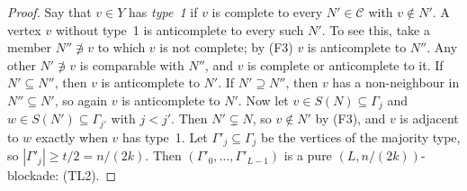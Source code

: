\begin{proof}
Say that $v\in Y$ has \emph{type~1} if $v$ is complete to every $N'\in\mathcal C$ with $v\notin N'$. A
vertex $v$ without type~1 is anticomplete to every such $N'$. To see this, take a member $N''\not\ni v$
to which $v$ is not complete; by (F3) $v$ is anticomplete to $N''$. Any other $N'\not\ni v$ is
comparable with $N''$, and $v$ is complete or anticomplete to it. If $N'\subseteq N''$, then $v$ is
anticomplete to $N'$. If $N'\supseteq N''$, then $v$ has a non-neighbour in $N''\subseteq N'$, so again
$v$ is anticomplete to $N'$. Now let $v\in S(N)\subseteq\Gamma_j$ and $w\in S(N')\subseteq\Gamma_{j'}$ with
$j<j'$. Then $N'\subsetneq N$, so $v\notin N'$ by (F3), and $v$ is adjacent to $w$ exactly when $v$ has
type~1. Let $\Gamma'_j\subseteq\Gamma_j$ be the vertices of the majority type, so $|\Gamma'_j|\ge t/2=n/(2k)$.
Then $(\Gamma'_0,\dots,\Gamma'_{L-1})$ is a pure $(L,n/(2k))$-blockade: (TL2).
\end{proof}

